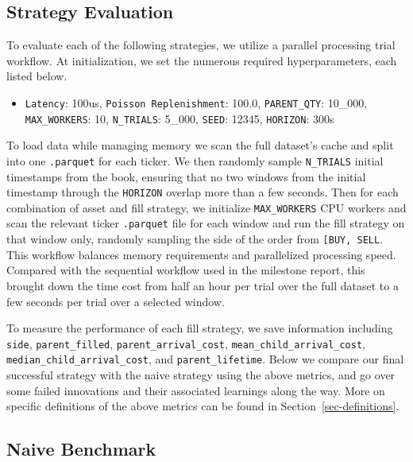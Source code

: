 \documentclass[
  letterpaper,
]{article}
\providecommand{\tightlist}{%
  \setlength{\itemsep}{0pt}\setlength{\parskip}{0pt}}
\begin{document}
\subsection{Strategy Evaluation}\label{strategy-evaluation}

To evaluate each of the following strategies, we utilize a parallel
processing trial workflow. At initialization, we set the numerous
required hyperparameters, each listed below.

\begin{itemize}
\tightlist
\item
  \texttt{Latency}: 100us, \texttt{Poisson\ Replenishment}: 100.0,
  \texttt{PARENT\_QTY}: 10\_000, \texttt{MAX\_WORKERS}: 10,
  \texttt{N\_TRIALS}: 5\_000, \texttt{SEED}: 12345, \texttt{HORIZON}:
  300s
\end{itemize}

To load data while managing memory we scan the full dataset's cache and
split into one \texttt{.parquet} for each ticker. We then randomly
sample \texttt{N\_TRIALS} initial timestamps from the book, ensuring
that no two windows from the initial timestamp through the
\texttt{HORIZON} overlap more than a few seconds. Then for each
combination of asset and fill strategy, we initialize
\texttt{MAX\_WORKERS} CPU workers and scan the relevant ticker
\texttt{.parquet} file for each window and run the fill strategy on that
window only, randomly sampling the side of the order from
\texttt{{[}\textquotesingle{}BUY\textquotesingle{},\ \textquotesingle{}SELL\textquotesingle{}{]}}.
This workflow balances memory requirements and parallelized processing
speed. Compared with the sequential workflow used in the milestone
report, this brought down the time cost from half an hour per trial over
the full dataset to a few seconds per trial over a selected window.

To measure the performance of each fill strategy, we save information
including \texttt{side}, \texttt{parent\_filled},
\texttt{parent\_arrival\_cost}, \texttt{mean\_child\_arrival\_cost},
\texttt{median\_child\_arrival\_cost}, and \texttt{parent\_lifetime}.
Below we compare our final successful strategy with the naive strategy
using the above metrics, and go over some failed innovations and their
associated learnings along the way. More on specific definitions of the
above metrics can be found in Section~\ref{sec-definitions}.

\subsection{Naive Benchmark}\label{naive-benchmark}
\end{document}
